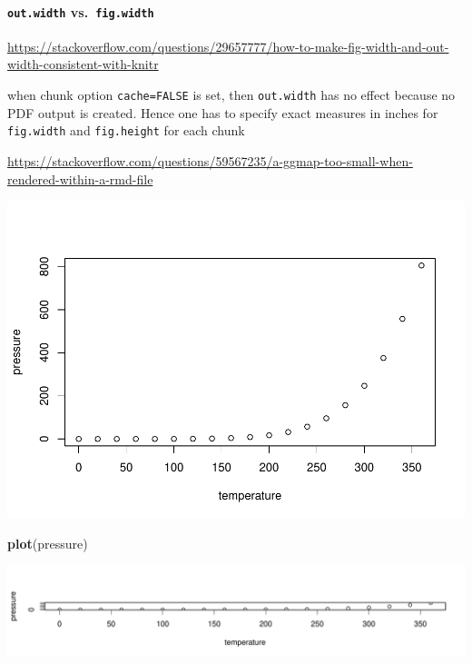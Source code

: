 \documentclass[
]{book}
\newenvironment{Shaded}{\begin{snugshade}}{\end{snugshade}}
\newcommand{\FunctionTok}[1]{\textcolor[rgb]{0.13,0.29,0.53}{\textbf{#1}}}
\newcommand{\NormalTok}[1]{#1}
\theoremstyle{definition}
\theoremstyle{definition}
\theoremstyle{definition}
\theoremstyle{definition}
\theoremstyle{remark}
\begin{document}
\paragraph{\texorpdfstring{\texttt{out.width} vs.~\texttt{fig.width}}{out.width vs.~fig.width}}\label{out.width-vs.-fig.width}

\url{https://stackoverflow.com/questions/29657777/how-to-make-fig-width-and-out-width-consistent-with-knitr}

when chunk option \texttt{cache=FALSE} is set, then \texttt{out.width} has no effect because no PDF output is created. Hence one has to specify exact measures in inches for \texttt{fig.width} and \texttt{fig.height} for each chunk

\url{https://stackoverflow.com/questions/59567235/a-ggmap-too-small-when-rendered-within-a-rmd-file}

\begin{center}\includegraphics[width=1\linewidth]{202401280001-test_files/figure-latex/unnamed-chunk-13-1} \end{center}

\begin{Shaded}
\begin{Highlighting}[]
\FunctionTok{plot}\NormalTok{(pressure)}
\end{Highlighting}
\end{Shaded}

\includegraphics{202401280001-test_files/figure-latex/unnamed-chunk-14-1.pdf}
\end{document}
